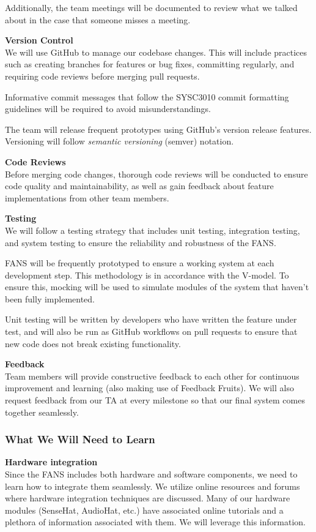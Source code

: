 Additionally, the team meetings will be documented to review what we talked about in the case that someone misses a
meeting.

\textbf{Version Control} \\
We will use GitHub to manage our codebase changes. This will include practices such as creating branches for features or bug
fixes, committing regularly, and requiring code reviews before merging pull requests.

Informative commit messages that follow the SYSC3010 commit formatting guidelines will be required to avoid
misunderstandings.

The team will release frequent prototypes using GitHub's version release features. Versioning will follow
\textit{semantic versioning} (semver) notation. \cite{semver}

\textbf{Code Reviews} \\
Before merging code changes, thorough code reviews will be conducted to ensure code quality and maintainability, as well
as gain feedback about feature implementations from other team members.

\textbf{Testing} \\
We will follow a testing strategy that includes unit testing, integration testing, and system testing to ensure the
reliability and robustness of the FANS.

FANS will be frequently prototyped to ensure a working system at each development step. This methodology is in
accordance with the V-model. \cite{v-model} To ensure this, mocking will be used to simulate modules of the system that
haven't been fully implemented.

Unit testing will be written by developers who have written the feature under test, and will also be run as GitHub
workflows on pull requests to ensure that new code does not break existing functionality.

\textbf{Feedback} \\
Team members will provide constructive feedback to each other for continuous improvement and learning (also making use
of Feedback Fruits). We will also request feedback from our TA at every milestone so that our final system comes together
seamlessly.

\subsubsection{What We Will Need to Learn}

\textbf{Hardware integration} \\
Since the FANS includes both hardware and software components, we need to learn how to integrate them seamlessly. We
utilize online resources and forums where hardware integration techniques are discussed. Many of our hardware modules
(SenseHat, AudioHat, etc.) have associated online tutorials and a plethora of information associated with them.
\cite{sensehat} We will leverage this information.

